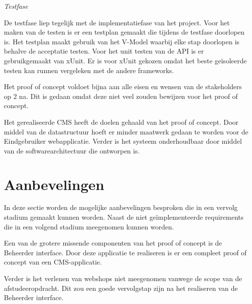 \begin{center}
\textit{Testfase}
\end{center}

\whitespace
De testfase liep tegelijk met de implementatiefase van het project.
Voor het maken van de testen is er een testplan gemaakt die tijdens de testfase doorlopen is.
Het testplan maakt gebruik van het V-Model waarbij elke stap doorlopen is behalve de acceptatie testen.
Voor het unit testen van de API is er gebruikgemaakt van xUnit.
Er is voor xUnit gekozen omdat het beste geïsoleerde testen kan runnen vergeleken met de andere frameworks.

\whitespace
Het proof of concept voldoet bijna aan alle eisen en wensen van de stakeholders op 2 na.
Dit is gedaan omdat deze niet veel zouden bewijzen voor het proof of concept.
%

\whitespace
Het gerealiseerde CMS heeft de doelen gehaald van het proof of concept.
Door middel van de datastructuur hoeft er minder maatwerk gedaan te worden voor de \gls{Eindgebruiker} webapplicatie. 
Verder is het systeem onderhoudbaar door middel van de softwarearchitectuur die ontworpen is.



\section{Aanbevelingen}
In deze sectie worden de mogelijke aanbevelingen besproken die in een vervolg stadium gemaakt kunnen worden.
Naast de niet geïmplementeerde requirements die in een volgend stadium meegenomen kunnen worden.

\whitespace
Een van de grotere missende componenten van het proof of concept is de \gls{Beheerder} interface.
Door deze applicatie te realiseren is er een compleet proof of concept van een \gls{CMS}-applicatie.

\whitespace
Verder is het verlenen van webshops niet meegenomen vanwege de scope van de afstudeeropdracht.
Dit zou een goede vervolgstap zijn na het realiseren van de \gls{Beheerder} interface.
